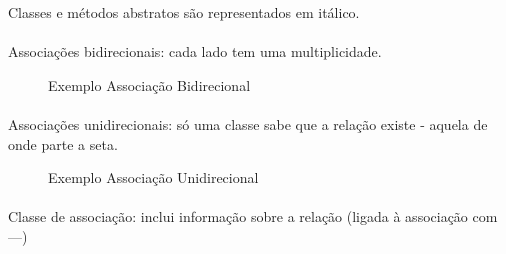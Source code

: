 \documentclass[../resumosLPOO.tex]{subfiles}
\begin{document}
Classes e métodos abstratos são representados em itálico.

\paragraph{}

Associações bidirecionais: cada lado tem uma multiplicidade.

\begin{figure}[H]
    \centering
    \caption{Exemplo Associação Bidirecional\label{fig:inheritance}}
\end{figure}

\paragraph{}

Associações unidirecionais: só uma classe sabe que a relação existe - aquela de onde parte a seta.

\begin{figure}[H]
    \centering
    \caption{Exemplo Associação Unidirecional\label{fig:inheritance}}
\end{figure}

\paragraph{}

Classe de associação: inclui informação sobre a relação (ligada à associação com ---)

\paragraph{}
\end{document}

